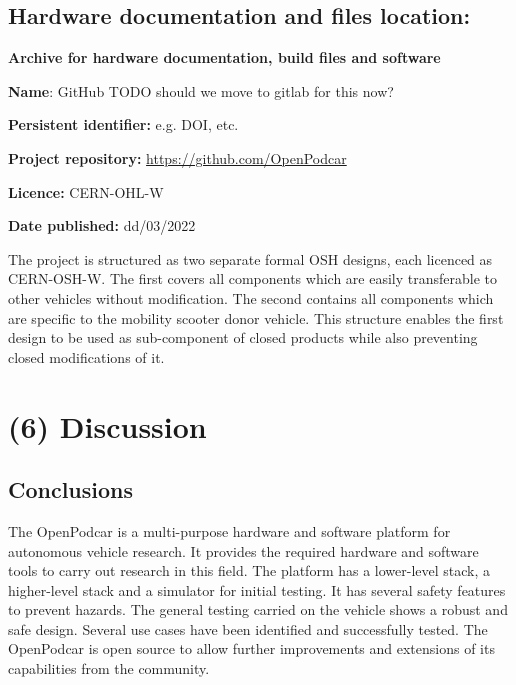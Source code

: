 \documentclass[a4paper]{article}
\begin{document}
	\subsection{Hardware documentation and files location:}\label{h.nbisrsde6sc3}
	
	\textbf{Archive for hardware documentation, build files and software}
	
	\textbf{Name}: GitHub   TODO should we move to gitlab for this now?
	
	\textbf{Persistent identifier:} e.g. DOI, etc.
	
	\textbf{Project repository:} \url{https://github.com/OpenPodcar}
	
	\textbf{Licence:} CERN-OHL-W 
	
	\textbf{Date published:} dd/03/2022
	
	The project is structured as two separate formal OSH designs, each licenced as CERN-OSH-W.   The first covers all components which are easily transferable to other vehicles without modification. The second contains all components which are specific to the mobility scooter donor vehicle. This structure enables the first design to be used as sub-component of closed products while also preventing closed modifications of it.
	
	
	
	\section{(6) Discussion}\label{h.90jl7wm65t65}
	
	\subsection{Conclusions}\label{h.h3fr33ylzsnh}
	
	
	The OpenPodcar is a multi-purpose hardware and software platform for autonomous vehicle research. It provides the required hardware and software tools to carry out research in this field. The platform has a lower-level stack, a higher-level stack and a simulator for initial testing. It has several safety features to prevent hazards. The general testing carried on the vehicle shows a robust and safe design. Several use cases have been identified and successfully tested. The OpenPodcar is open source to allow further improvements and extensions of its capabilities from the community.
	
\end{document}

